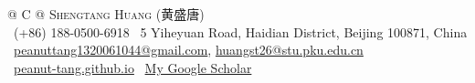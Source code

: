 \documentclass[a4paper,12pt]{ctexart}
\begin{document}
\pagestyle{empty} 



\begin{tabularx}{\linewidth}{@{} C @{}}
\Huge{\scshape Shengtang Huang (黄盛唐)} \\[7.5pt]
\raisebox{-0.05\height}\faPhone \ (+86) 188-0500-6918 \quad \faHome \ 5 Yiheyuan Road, Haidian District, Beijing 100871, China \\
\raisebox{-0.05\height}\faEnvelope \ \href{mailto:peanuttang1320061044@gmail.com}{peanuttang1320061044@gmail.com}, \href{mailto:huangst26@stu.pku.edu.cn}{huangst26@stu.pku.edu.cn} \\
\raisebox{-0.05\height}\faGlobe \ \href{https://peanut-tang.github.io/}{peanut-tang.github.io} \quad \faGraduationCap \ \href{https://scholar.google.com/citations?user=ZW6vsmAAAAAJ}{My Google Scholar} \\
\end{tabularx}







\end{document}
